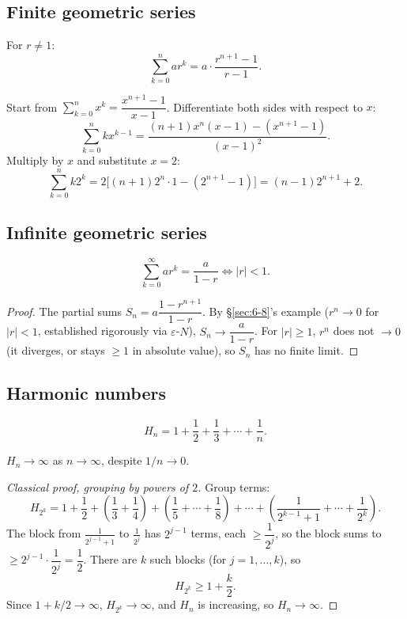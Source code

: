 \documentclass[11pt]{article}
\begin{document}
\subsection{Finite geometric series}
\label{sec:6-13}

\begin{theorem}
For $r\neq1$:
\[
\sum_{k=0}^n ar^k = a\cdot\frac{r^{n+1}-1}{r-1}.
\]
\end{theorem}

\bigskip
\begin{example}
Start from $\sum_{k=0}^n x^k = \dfrac{x^{n+1}-1}{x-1}$. Differentiate both sides with respect to $x$:
\[
\sum_{k=0}^n kx^{k-1} = \frac{(n+1)x^n(x-1)-(x^{n+1}-1)}{(x-1)^2}.
\]
Multiply by $x$ and substitute $x=2$:
\[
\sum_{k=0}^n k2^k = 2\big[(n+1)2^n\cdot1-(2^{n+1}-1)\big] = (n-1)2^{n+1}+2.
\]
\end{example}

\subsection{Infinite geometric series}
\label{sec:6-14}

\begin{theorem}
\[
\sum_{k=0}^\infty ar^k = \frac{a}{1-r} \iff |r|<1.
\]
\end{theorem}
\begin{proof}
The partial sums $S_n = a\dfrac{1-r^{n+1}}{1-r}$. By \S\ref{sec:6-8}'s example ($r^n\to0$ for $|r|<1$, established rigorously via $\varepsilon$-$N$), $S_n \to \dfrac{a}{1-r}$. For $|r|\ge1$, $r^n$ does not $\to0$ (it diverges, or stays $\ge1$ in absolute value), so $S_n$ has no finite limit.
\end{proof}

\subsection{Harmonic numbers}
\label{sec:6-15}

\begin{definition}
\[
H_n = 1+\frac12+\frac13+\cdots+\frac1n.
\]
\end{definition}

\begin{theorem}
$H_n\to\infty$ as $n\to\infty$, despite $1/n\to0$.
\end{theorem}
\begin{proof}[Classical proof, grouping by powers of $2$]
Group terms:
\[
H_{2^k} = 1 + \frac12 + \left(\frac13+\frac14\right) + \left(\frac15+\cdots+\frac18\right) + \cdots + \left(\frac{1}{2^{k-1}+1}+\cdots+\frac{1}{2^k}\right).
\]
The block from $\frac{1}{2^{j-1}+1}$ to $\frac{1}{2^j}$ has $2^{j-1}$ terms, each $\ge \dfrac{1}{2^j}$, so the block sums to $\ge 2^{j-1}\cdot\dfrac{1}{2^j}=\dfrac12$. There are $k$ such blocks (for $j=1,\dots,k$), so
\[
H_{2^k} \ge 1+\frac{k}{2}.
\]
Since $1+k/2\to\infty$, $H_{2^k}\to\infty$, and $H_n$ is increasing, so $H_n\to\infty$.
\end{proof}
\end{document}
